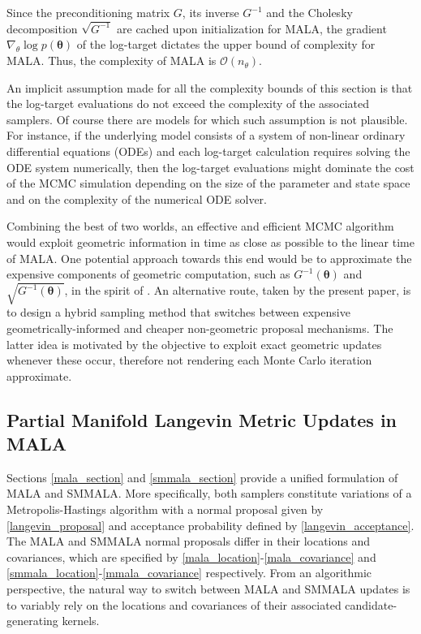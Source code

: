 \documentclass[twoside,11pt]{article}
\begin{document}
Since the preconditioning matrix $G$, its inverse $G^{-1}$ and the Cholesky decomposition $\sqrt{G^{-1}}$ are cached upon 
initialization for MALA, the gradient $\nabla_{\theta}\log{p(\boldsymbol{\theta})}$  of the log-target dictates the upper
bound of complexity for MALA. Thus, the complexity of MALA is $\mathcal{O}(n_{\theta})$.

An implicit assumption made for all the complexity bounds of this section is that the log-target evaluations do not
exceed the complexity of the associated samplers. Of course there are models for which such assumption is not plausible.
For instance, if the underlying model consists of a system of non-linear ordinary differential equations (ODEs) and each 
log-target calculation requires solving the ODE system numerically, then the log-target evaluations might dominate the
cost of the MCMC simulation depending on the size of the parameter and state space and on the complexity of the numerical 
ODE solver.

Combining the best of two worlds, an effective and efficient MCMC algorithm would exploit geometric information in time as 
close as possible to the linear time of MALA. One potential approach towards this end would be to approximate the expensive 
components of geometric computation, such as $G^{-1}(\boldsymbol{\theta})$ and $\sqrt{G^{-1}(\boldsymbol{\theta})}$, in the 
spirit of \cite{sim_bad_cem__sto}. An alternative route, taken by the present paper, is to design a hybrid sampling method 
that switches between expensive geometrically-informed and cheaper non-geometric proposal mechanisms. The latter idea is
motivated by the objective to exploit exact geometric updates whenever these occur, therefore not rendering each Monte Carlo 
iteration approximate.

\subsection{Partial Manifold Langevin Metric Updates in MALA}

Sections \ref{mala_section} and \ref{smmala_section} provide a unified formulation of MALA and SMMALA. More specifically, 
both samplers constitute variations of a Metropolis-Hastings algorithm with a normal proposal given by 
\eqref{langevin_proposal} and acceptance probability defined by \eqref{langevin_acceptance}. The MALA and SMMALA normal 
proposals differ in their locations and covariances, which are specified by \eqref{mala_location}-\eqref{mala_covariance} 
and \eqref{smmala_location}-\eqref{mmala_covariance} respectively. From an algorithmic perspective, the natural way to 
switch between MALA and SMMALA updates is to variably rely on the locations and covariances of their associated 
candidate-generating kernels.
\end{document}
